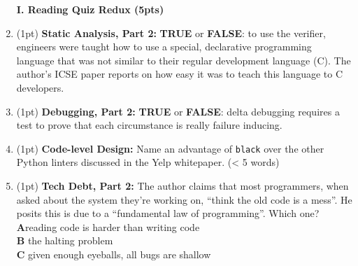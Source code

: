 \documentclass{report}
\newif\ifkey
\newcommand{\correct}[1]{\ifkey\color{red}\textbf{#1}\color{black}\else\textbf{#1}\fi\xspace}
\newcommand{\answershort}[1]{\ifkey\color{red}\underline{\textbf{#1}}\color{black}\else\underline{\hspace{3in}}\fi\xspace}
\newcommand*{\pts}[1]{\addtocounter{points}{#1}(#1pt)}
\begin{document}
\begin{spacing}{1.4}
\begin{enumerate}[leftmargin=*]
\newpage

\textbf{I. Reading Quiz Redux (5pts)}

\item \pts{1}
  \textbf{Static Analysis, Part 2:} \textbf{TRUE} or
  \correct{FALSE}: to use the verifier, engineers were taught how to
  use a special, declarative programming language that was not similar
  to their regular development language (C). The author's ICSE paper
  reports on how easy it was to teach this language to C developers.

\item \pts{1}
  \textbf{Debugging, Part 2:} \correct{TRUE} or \textbf{FALSE}:
  delta debugging requires a test to prove that each circumstance is really failure inducing.

\item \pts{1}
  \textbf{Code-level Design:} Name an advantage of \texttt{black} over the other Python linters discussed in the Yelp whitepaper. (< 5 words)
  \\ \answershort{any of: opinionated; resolves errors automatically; consistency}


\item \pts{1}
  \textbf{Tech Debt, Part 2:}
  The author claims that most programmers, when asked about the system they’re working on, “think the old code is a mess”. He posits this is due to a “fundamental law of programming”. Which one?
  \\ \correct{A}\hspace{0.2in}reading code is harder than writing code
  \\ \textbf{B}\hspace{0.2in} the halting problem
  \\ \textbf{C}\hspace{0.2in} given enough eyeballs, all bugs are shallow



\end{enumerate}
\end{spacing}
\end{document}
